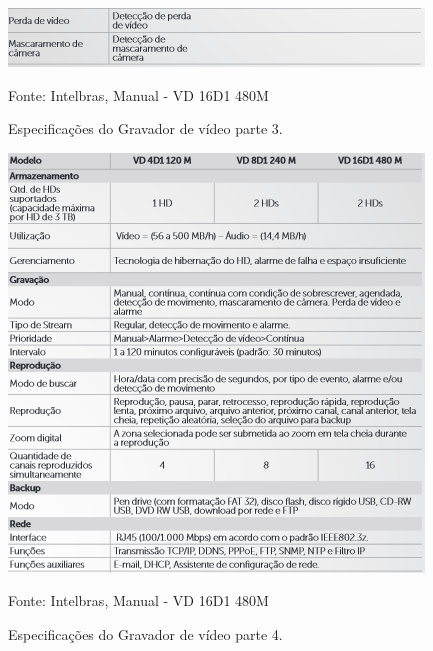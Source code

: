 \begin{itemize}
\begin{itemize}
	\begin{figure}[H]
	 \centering
	\label{Especificações do Gravador de vídeo parte 3}
	 \includegraphics[keepaspectratio=true,scale=0.8]{monitoramento/17.png}
	 \caption{Especificações do Gravador de vídeo parte 3.}
	 \small{Fonte: Intelbras, Manual - VD 16D1 480M}
	\end{figure}
	
	\begin{figure}[H]
	 \centering
	\label{Especificações do Gravador de vídeo parte 4}
	 \includegraphics[keepaspectratio=true,scale=0.8]{monitoramento/18.png}
	 \caption{Especificações do Gravador de vídeo parte 4.}
	 \small{Fonte: Intelbras, Manual - VD 16D1 480M}
	\end{figure}
	

\end{itemize}
\end{itemize}
